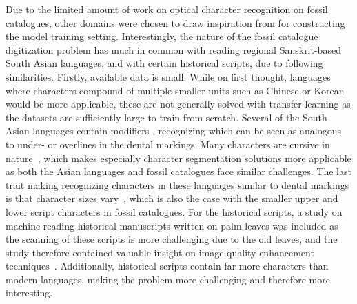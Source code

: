 \documentclass[english,twoside,openright]{UH_DS_MSc}
\begin{document}
Due to the limited amount of work on optical character recognition on fossil catalogues, other 
domains were chosen to draw inspiration from for constructing the model training setting. 
Interestingly, the nature of the fossil catalogue digitization problem has much in common with 
reading regional Sanskrit-based South Asian languages, and with certain historical 
scripts, due to following similarities.
Firstly, available data is small. While on first thought, languages where characters compound of
 multiple smaller units such as  Chinese or Korean would be more applicable, these are not
  generally solved with transfer learning as the datasets are sufficiently large to train from scratch.
Several of the South Asian languages contain modifiers \cite{2limbachiyaGujarati,3chatterjeeBengali,5rasheedHandwrittenUrduWAlexNet},
recognizing which can be seen as analogous to under- or overlines in the dental markings.
Many characters are cursive in nature~\cite{5rasheedHandwrittenUrduWAlexNet}, which makes
 especially character segmentation 
solutions more applicable as both the Asian languages and fossil catalogues face similar challenges.
The last trait making recognizing characters in these languages similar to dental markings is that character sizes vary~\cite{6shoponBangla},
which is also the case with the  smaller upper and lower script characters in fossil catalogues.
For the historical scripts, a study on machine reading historical manuscripts written on palm leaves was 
included as the scanning of these scripts is more challenging due to the old leaves, and the 
study therefore contained valuable insight on image quality enhancement techniques~\cite{9thuonPalm}. Additionally, historical scripts 
contain far more characters than modern languages, making the problem more challenging and therefore more interesting.

\end{document}
